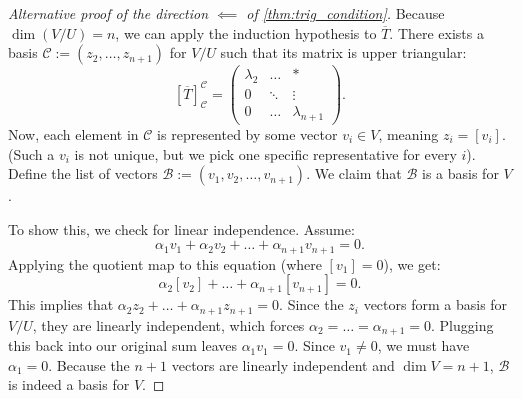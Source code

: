 \begin{proof}[Alternative proof of the direction $\impliedby$ of \cref{thm:trig_condition}]
  Because $\dim(V/U) = n$, we can apply the induction hypothesis to $\overline{T}$. There exists a basis $\mathcal{C} := (z_2, \dots, z_{n+1})$ for $V/U$ such that its matrix is upper triangular:
  \begin{equation} \label{eq:quotient_upper_triangular}
    [\overline{T}]_{\mathcal{C}}^{\mathcal{C}} = \begin{pmatrix} \lambda_2 & \dots & * \\ 0 & \ddots & \vdots \\ 0 & \dots & \lambda_{n+1} \end{pmatrix}.
  \end{equation}
  Now, each element in $\mathcal{C}$ is represented by some vector $v_i \in V$, meaning $z_i = [v_i]$. (Such a $v_i$ is not unique, but we pick one specific representative for every $i$).
  Define the list of vectors $\mathcal{B} := (v_1, v_2, \dots, v_{n+1})$. We claim that $\mathcal{B}$ is a basis for $V$.

  To show this, we check for linear independence. Assume:
  \[ \alpha_1 v_1 + \alpha_2 v_2 + \dots + \alpha_{n+1} v_{n+1} = 0. \]
  Applying the quotient map to this equation (where $[v_1] = 0$), we get:
  \[ \alpha_2[v_2] + \dots + \alpha_{n+1}[v_{n+1}] = 0. \]
  This implies that $\alpha_2 z_2 + \dots + \alpha_{n+1} z_{n+1} = 0$.
  Since the $z_i$ vectors form a basis for $V/U$, they are linearly independent, which forces $\alpha_2 = \dots = \alpha_{n+1} = 0$.
  Plugging this back into our original sum leaves $\alpha_1 v_1 = 0$. Since $v_1 \ne 0$, we must have $\alpha_1 = 0$.
  Because the $n+1$ vectors are linearly independent and $\dim V = n+1$, $\mathcal{B}$ is indeed a basis for $V$.


\end{proof}
